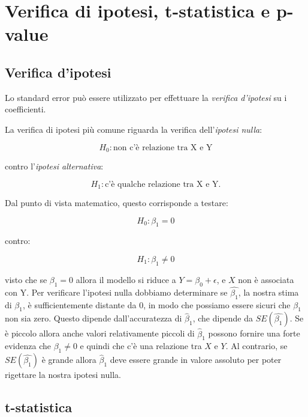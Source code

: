 \section{Verifica di ipotesi, t-statistica e p-value}

\subsection{Verifica d'ipotesi}

Lo standard error può essere utilizzato per effettuare la
\textit{verifica d'ipotesi} su i coefficienti.

La verifica di ipotesi più comune riguarda la verifica
dell'\textit{ipotesi nulla}:

\begin{equation}
H_0: \text{non c'è relazione tra X e Y}
\end{equation}

contro l'\textit{ipotesi alternativa}:

\begin{equation}
H_1: \text{c'è qualche relazione tra X e Y}.
\end{equation}

Dal punto di vista matematico, questo corrisponde a testare:

\begin{equation}
H_0: {\beta}_1 = 0
\end{equation}

contro:

\begin{equation}
H_1: {\beta}_1 \neq 0
\end{equation}

visto che se ${\beta}_1 = 0$ allora il modello si riduce a $Y = {\beta}_0 + \epsilon$, e $X$ non è associata con Y. Per verificare l'ipotesi nulla dobbiamo determinare se $\hat{{\beta}_1}$, la nostra stima di ${\beta}_1$, è sufficientemente distante da $0$, in modo che possiamo essere sicuri che ${\beta}_1$ non sia zero. Questo dipende dall'accuratezza di ${\hat{\beta}_1}$, che dipende da $SE(\hat{{\beta}_1})$. Se è piccolo allora anche valori relativamente piccoli di ${\hat{\beta}}_1$ possono fornire una forte evidenza che ${\beta}_1 \neq 0$ e quindi che c'è una relazione tra $X$ e $Y$. Al contrario, se $SE(\hat{{\beta}_1})$ è grande allora ${\hat{\beta}}_1$ deve essere grande in valore assoluto per poter rigettare la nostra ipotesi nulla.

\subsection{t-statistica}

